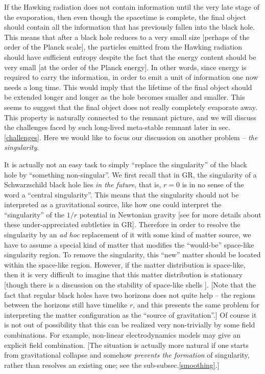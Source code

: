 \documentclass[12pt]{article}
\newcommand{\2}{$^2$}
\newcommand{\3}{$^3$}
\newcommand{\4}{$_4$}
\newcommand{\5}{$_5$}
\begin{document}
If the Hawking radiation does not contain information until the very late stage of the evaporation, then even though the spacetime is complete, the final object should contain all the information that has previously fallen into the black hole.
This means that after a black hole reduces to a very small size [perhaps of the order of the Planck scale], the particles emitted from the Hawking radiation should have sufficient entropy despite the fact that the energy content should be very small [at the order of the Planck energy]. In other words, since energy is required to carry the information, in order to emit a unit of information one now needs a long time. This would imply that the lifetime of the final object should be extended longer and longer as the hole becomes smaller and smaller. This seems to suggest that the final object does not really completely evaporate away. This property is naturally connected to the remnant picture, and we will discuss the challenges faced by such long-lived meta-stable remnant later in sec.\ref{challenges}. Here we would like to focus our discussion on another problem -- \emph{the singularity}.



It is actually not an easy task to simply ``replace the singularity'' of the black hole by ``something non-singular''. 
We first recall that in GR, the singularity of a Schwarzschild black hole lies \emph{in the future}, that is, $r=0$ is in no sense of the word a ``central singularity''. This means that the singularity should not be interpreted as a gravitational source, like how one could interpret the ``singularity'' of the $1/r$ potential in Newtonian gravity [see \cite{mcinnesessay} for more details about these under-appreciated subtleties in GR].
Therefore in order to resolve the singularity by an \emph{ad hoc} replacement of it with some kind of matter source, we have to assume a special kind of matter that modifies the ``would-be'' space-like singularity region. To remove the singularity, this ``new'' matter should be located within the space-like region. However, if the matter distribution is space-like, then it is very difficult to imagine that this matter distribution is stationary [though there is a discussion on the stability of space-like shells \cite{Balbinot:1990zz}]. [Note that the fact that regular black holes have two horizons does not quite help -- the regions between the horizons still have timelike $r$, and this presents the same problem for interpreting the matter configuration as the ``source of gravitation''.] Of course it is not out of possibility that this can be realized very non-trivially by some field combinations. For example, non-linear electrodynamics models \cite{AyonBeato:1999rg} may give an explicit field combination. [The situation is actually more natural if one starts from gravitational collapse and somehow \emph{prevents the formation} of singularity, rather than resolves an existing one; see the sub-subsec.\ref{smoothing}.] 
\end{document}
